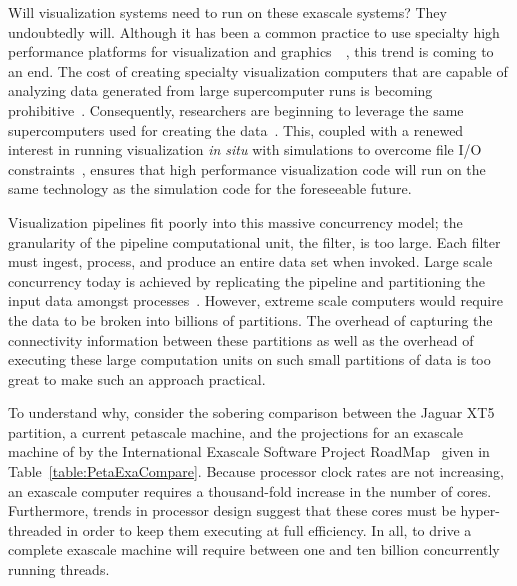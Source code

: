 \documentclass{vgtc}                          %
\newcommand*{\lcite}[1]{~\cite{#1}}
\begin{document}
Will visualization systems need to run on these exascale systems?  They
undoubtedly will.  Although it has been a common practice to use specialty
high performance platforms for visualization and graphics~\lcite{Wylie01},
this trend is coming to an end.  The cost of creating specialty
visualization computers that are capable of analyzing data generated from
large supercomputer runs is becoming prohibitive\lcite{Childs07}.
Consequently, researchers are beginning to leverage the same supercomputers
used for creating the data\lcite{Peterka09:SC,Peterka09:SciDAC,Yu08}.
This, coupled with a renewed interest in running visualization
\emph{in situ} with simulations to overcome file I/O
constraints\lcite{SNL092014,Tu06,Ross08,MaInSitu09,MaInSitu07},
ensures that high performance
visualization code will run on the same technology as the simulation code
for the foreseeable future.

Visualization pipelines fit poorly into this massive concurrency model; the
granularity of the pipeline computational unit, the filter, is too large.
Each filter must ingest, process, and produce an entire data set when
invoked.  Large scale concurrency today is achieved by replicating the
pipeline and partitioning the input data amongst processes\lcite{Ahrens00}.
However, extreme scale computers would require the data to be broken into
billions of partitions.  The overhead of capturing the connectivity
information between these partitions as well as the overhead of executing
these large computation units on such small partitions of data is too great
to make such an approach practical.

To understand why, consider the sobering comparison between the
Jaguar XT5 partition, a current petascale machine, and the projections for
an exascale machine of by the International Exascale Software Project
RoadMap\lcite{ExascaleRoadMap} given in Table~\ref{table:PetaExaCompare}.
Because processor clock rates are not increasing, an exascale computer
requires a thousand-fold increase in the number of cores.  Furthermore,
trends in processor design suggest that these cores must be hyper-threaded
in order to keep them executing at full efficiency.  In all, to drive a
complete exascale machine will require between one and ten billion
concurrently running threads.
\end{document}
